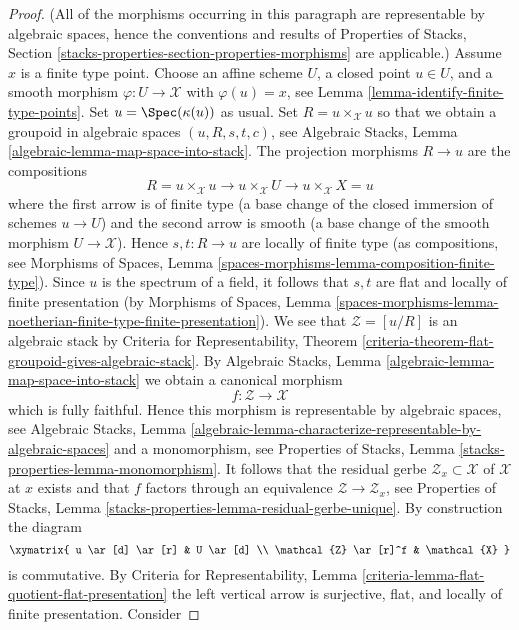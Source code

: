 \begin{proof}
(All of the morphisms occurring in this paragraph are representable
by algebraic spaces, hence the conventions and results of
Properties of Stacks,
Section \ref{stacks-properties-section-properties-morphisms}
are applicable.)
Assume $x$ is a finite type point. Choose an affine scheme $U$,
a closed point $u \in U$, and a smooth morphism $\varphi : U \to \mathcal{X}$
with $\varphi(u) = x$, see
Lemma \ref{lemma-identify-finite-type-points}.
Set $u = \Spec(\kappa(u))$ as usual. Set $R = u \times_\mathcal{X} u$
so that we obtain a groupoid in algebraic spaces
$(u, R, s, t, c)$, see
Algebraic Stacks, Lemma \ref{algebraic-lemma-map-space-into-stack}.
The projection morphisms $R \to u$ are the compositions
$$
R = u \times_\mathcal{X} u \to
u \times_\mathcal{X} U \to
u \times_\mathcal{X} X = u
$$
where the first arrow is of finite type (a base change of the closed
immersion of schemes $u \to U$) and the second arrow is smooth (a base
change of the smooth morphism $U \to \mathcal{X}$). Hence
$s, t : R \to u$ are locally of finite type (as compositions, see
Morphisms of Spaces,
Lemma \ref{spaces-morphisms-lemma-composition-finite-type}).
Since $u$ is the spectrum of a field, it follows that
$s, t$ are flat and locally of finite presentation (by
Morphisms of Spaces, Lemma
\ref{spaces-morphisms-lemma-noetherian-finite-type-finite-presentation}).
We see that $\mathcal{Z} = [u/R]$ is an algebraic stack by
Criteria for Representability,
Theorem \ref{criteria-theorem-flat-groupoid-gives-algebraic-stack}.
By
Algebraic Stacks, Lemma \ref{algebraic-lemma-map-space-into-stack}
we obtain a canonical morphism
$$
f : \mathcal{Z} \longrightarrow \mathcal{X}
$$
which is fully faithful. Hence this morphism is representable by
algebraic spaces, see
Algebraic Stacks, Lemma
\ref{algebraic-lemma-characterize-representable-by-algebraic-spaces}
and a monomorphism, see
Properties of Stacks, Lemma \ref{stacks-properties-lemma-monomorphism}.
It follows that the residual gerbe $\mathcal{Z}_x \subset \mathcal{X}$
of $\mathcal{X}$ at $x$ exists and that $f$ factors through an
equivalence $\mathcal{Z} \to \mathcal{Z}_x$, see
Properties of Stacks, Lemma
\ref{stacks-properties-lemma-residual-gerbe-unique}.
By construction the diagram
$$
\xymatrix{
u \ar[d] \ar[r] & U \ar[d] \\
\mathcal{Z} \ar[r]^f & \mathcal{X}
}
$$
is commutative. By
Criteria for Representability,
Lemma \ref{criteria-lemma-flat-quotient-flat-presentation}
the left vertical arrow is surjective, flat, and locally of finite
presentation. Consider

\end{proof}
